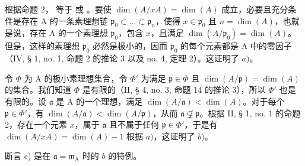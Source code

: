 根据命题 2，  等于  或  。要使 \(\dim(A/xA) = \dim(A)\) 成立，必要且充分条件是存在 A 的一条素理想链 \(\mathfrak{p}_0 \subset \ldots \subset \mathfrak{p}_n\)，使得 \(x \in \mathfrak{p}_0\) 且 \(n = \dim(A)\)，也就是说，存在 A 的一个素理想 \(\mathfrak{p}_0\)，包含 \(x\)，且满足 \(\dim(A/\mathfrak{p}_0) = \dim(A)\)。但是，这样的素理想 \(\mathfrak{p}_0\) 必然是极小的，因而 \(\mathfrak{p}_0\) 的每个元素都是 A 中的零因子（IV, § 1, no. 1, 命题 2 的推论 3 以及 no. 4, 定理 2）。这证明了 \(a)\)。

令 \(\Phi\) 为 A 的极小素理想集合，令 \(\Phi'\) 为满足 \(\mathfrak{p} \in \Phi\) 且 \(\dim(A/\mathfrak{p}) = \dim(A)\) 的集合。我们知道 \(\Phi\) 是有限的（II, § 4, no. 3, 命题 14 的推论 3），所以 \(\Phi'\) 也是有限的。设 \(\mathfrak{a}\) 是 A 的一个理想，满足 \(\dim(A/\mathfrak{a}) < \dim(A)\)。对于每个 \(\mathfrak{p} \in \Phi'\)，有 \(\dim(A/\mathfrak{a}) < \dim(A/\mathfrak{p})\)，从而 \(\mathfrak{a} \not\subsetneq \mathfrak{p}\)。根据 II, § 1, no. 1 的命题 2，存在一个元素 \(x\)，属于 \(\mathfrak{a}\) 且不属于任何 \(\mathfrak{p} \in \Phi'\)，于是有 \(\dim(A/xA) = \dim(A) - 1\) 根据 \(a)\)，这证明了 \(b)\)。

断言 c) 是在 \(\mathfrak{a} = \mathfrak{m}_{\mathrm{A}}\) 时的 \(b\) 的特例。
